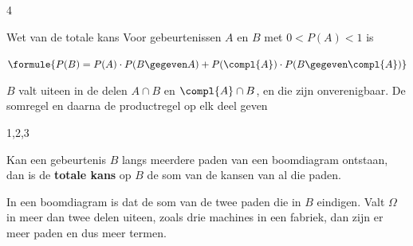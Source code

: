 \begin{alleenvoor}{4}
\begin{theorie}
\begin{stelling}{Wet van de totale kans}
Voor gebeurtenissen $A$ en $B$ met $0 < P(A) < 1$ is

\vspace{1mm}
\qquad $\formule{P(B) = P(A) \cdot P(B \gegeven A) + P(\compl{A}) \cdot P(B \gegeven \compl{A})}$
\end{stelling}

\begin{bewijs}
$B$ valt uiteen in de delen $A \cap B$ en $\compl{A} \cap B$, en die zijn onverenigbaar. De somregel en daarna de productregel op elk deel geven
\end{bewijs}
\end{theorie}
\end{alleenvoor}
\begin{alleenvoor}{1,2,3}
\begin{theorie}
Kan een gebeurtenis $B$ langs meerdere paden van een boomdiagram ontstaan, dan is de \textbf{\textcolor{accent}{totale kans}} op $B$ de som van de kansen van al die paden.
\end{theorie}
\end{alleenvoor}

In een boomdiagram is dat de som van de twee paden die in $B$ eindigen. Valt $\Omega$ in meer dan twee delen uiteen, zoals drie machines in een fabriek, dan zijn er meer paden en dus meer termen.

